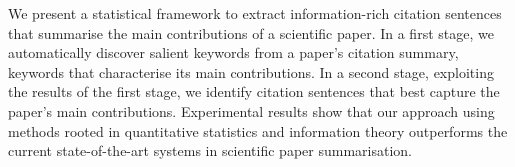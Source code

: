 We present a statistical framework to extract information-rich citation sentences that summarise the main contributions of a scientific paper. In a first stage, we automatically discover salient keywords from a paper's citation summary, keywords that characterise its main contributions. In a second stage, exploiting the results of the first stage, we identify citation sentences that best capture the paper's main contributions. Experimental results show that our approach using methods rooted in quantitative statistics and information theory outperforms the current state-of-the-art systems in scientific paper summarisation.
